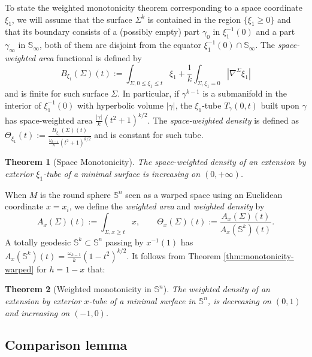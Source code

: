 \documentclass[11pt]{article}
\newtheorem{theorem}{Theorem}
\begin{document}
To state the weighted monotonicity theorem corresponding to a space coordinate \(\xi_1\),
we will assume that the surface \(\Sigma^k\) is contained in the region \(\{\xi_1 \geq 0\}\) and that its boundary consists of a (possibly empty) part
\(\gamma_0\) in \(\xi_1^{-1}(0)\) and a part \(\gamma_\infty\) in \(\mathbb{S}_\infty\), both of them
are disjoint from the equator \(\xi_1^{-1}(0) \cap \mathbb{S}_{\infty}\).
The \emph{space-weighted area} functional is defined by
\[
B_{\xi_1}(\Sigma)(t):=\int_{\Sigma, 0\leq\xi_1\leq t}\xi_1 + \frac{1}{k}\int_{\Sigma,\xi_1=0}|\nabla^\Sigma\xi_1|
\]
and is finite for such surface \(\Sigma\). In particular, if  \(\gamma^{k-1}\) is a submanifold in the interior of \(\xi_1^{-1}(0)\) with hyperbolic volume \(|\gamma|\), the \(\xi_1\)-tube  \(T_\gamma(0,t)\) built upon \(\gamma\) has space-weighted area \(\frac{|\gamma|}{k}(t^2+1)^{k/2}\).
The \emph{space-weighted density} is defined as \(\Theta_{\xi_1}(t):=\frac{B_{\xi_1}(\Sigma)(t)}{\frac{\omega_{k-1}}{k}(t^2+1)^{k/2}}\) and is
constant for such tube.
\begin{theorem}[Space Monotonicity]
\label{thm:monotonicity-H-space}
The space-weighted density of an extension by exterior \(\xi_1\)-tube of a minimal
surface is increasing on \((0,+\infty)\).
\end{theorem}

When \(M\) is the round sphere \(\mathbb{S}^n\) seen as a warped space using an Euclidean coordinate \(x=x_i\), we
define the \emph{weighted area} and \emph{weighted density} by
\[
 A_x(\Sigma)(t):= \int_{\Sigma,x\geq t}x,\qquad \Theta_x(\Sigma)(t) :=
\frac{A_x(\Sigma)(t)}{A_x(\mathbb{S}^k)(t)}.
\]
A totally geodesic \(\mathbb{S}^k\subset \mathbb{S}^n\) passing by \(x^{-1}(1)\) has  \(A_x(\mathbb{S}^k)(t) = \frac{\omega_{k-1}}{k}(1-t^2)^{k/2}\). 
It follows from Theorem \ref{thm:monotonicity-warped} for \(h=1-x\) that:

\begin{theorem}[Weighted monotonicity in \( \mathbb{S}^n \)]
\label{thm:monotonicity-S}
The weighted density of an extension by exterior
\(x\)-tube of a minimal surface in \(\mathbb{S}^n\), is decreasing on \((0, 1)\) and increasing on \((-1,0)\).
\end{theorem}
\subsection{Comparison lemma}
\label{sec:org2a3cdb8}
\end{document}
